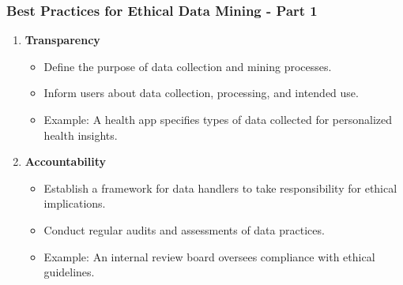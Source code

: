 \documentclass[aspectratio=169]{beamer}
\begin{document}
\begin{frame}[fragile]
    \frametitle{Best Practices for Ethical Data Mining - Part 1}
    \begin{enumerate}
        \item \textbf{Transparency}
            \begin{itemize}
                \item Define the purpose of data collection and mining processes.
                \item Inform users about data collection, processing, and intended use.
                \item Example: A health app specifies types of data collected for personalized health insights.
            \end{itemize}

        \item \textbf{Accountability}
            \begin{itemize}
                \item Establish a framework for data handlers to take responsibility for ethical implications.
                \item Conduct regular audits and assessments of data practices.
                \item Example: An internal review board oversees compliance with ethical guidelines.
            \end{itemize}
    \end{enumerate}
\end{frame}
\end{document}
